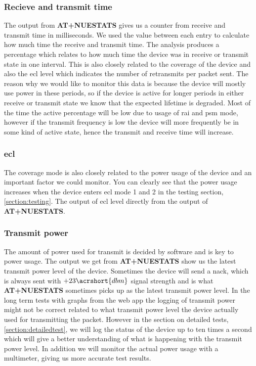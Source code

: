 \documentclass[USenglish]{ifimaster}  %
\begin{document}
\subsubsection{Recieve and transmit time}
The output from \textbf{AT+NUESTATS} gives us a counter from receive and transmit time in milliseconds. We used the value between each entry to calculate how much time the receive and transmit time. The analysis produces a percentage which relates to how much time the device was in receive or transmit state in one interval. This is also closely related to the coverage of the device and also the \acrshort{ecl} level which indicates the number of retransmits per packet sent. The reason why we would like to monitor this data is because the device will mostly use power in these periods, so if the device is active for longer periods in either receive or transmit state we know that the expected lifetime is degraded. Most of the time the active percentage will be low due to usage of \acrfull{rai} and \acrshort{psm} mode, however if the transmit frequency is low the device will more frequently be in some kind of active state, hence the transmit and receive time will increase.

\subsubsection{\acrshort{ecl}}
The coverage mode is also closely related to the power usage of the device and an important factor we could monitor. You can clearly see that the power usage increases when the device enters \acrshort{ecl} mode 1 and 2 in the testing section, \vref{section:testing}. The output of \acrshort{ecl} level directly from the output of \textbf{AT+NUESTATS}.

\subsubsection{Transmit power} \label{paragraph:txpower}
The amount of power used for transmit is decided by software and is key to power usage. The output we get from \textbf{AT+NUESTATS} show us the latest transmit power level of the device. Sometimes the device will send a \acrfull{nack}, which is always sent with ${+23 \acrshort{dbm}}$ signal strength and is what \textbf{AT+NUESTATS} sometimes picks up as the latest transmit power level\cite{email:nack}. In the long term tests with graphs from the web app the logging of transmit power might not be correct related to what transmit power level the device actually used for transmitting the packet. However in the section on detailed tests, \vref{section:detailedtest}, we will log the status of the device up to ten times a second which will give a better understanding of what is happening with the transmit power level. In addition we will monitor the actual power usage with a multimeter, giving us more accurate test results.
\end{document}
